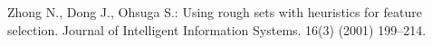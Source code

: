 \documentclass[11pt]{article}   %
\begin{document}
\begin{thebibliography}{}
	Zhong N., Dong J., Ohsuga S.:
	Using rough sets with heuristics for feature selection.
	Journal of Intelligent Information Systems. 16(3) (2001) 199--214.


			
%
%

\end{thebibliography}
\end{document}
